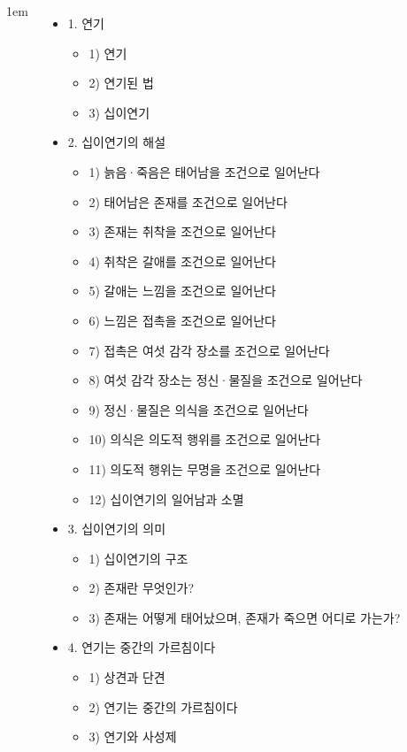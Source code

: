 \documentclass[	14pt, 
							a1paper, 
							portrait, %
							margin=0mm, %
							innermargin=10mm,  		%
							colspace=5mm, 
							subcolspace=0mm
							]{tikzposter}
\begin{document}
\begin{columns}
			{
					\setlength{\leftmargini}{2em}
					\setlength{\labelsep} {1em}
					\begin{itemize}
					\item 1. 연기
						\begin{itemize}
						\item 1) 연기
						\item 2) 연기된 법
						\item 3) 십이연기
						\end{itemize}

					\item 2. 십이연기의 해설
						\begin{itemize}
						\item 1) 늙음·죽음은 태어남을 조건으로 일어난다
						\item 2) 태어남은 존재를 조건으로 일어난다
						\item 3) 존재는 취착을 조건으로 일어난다
						\item 4) 취착은 갈애를 조건으로 일어난다
						\item 5) 갈애는 느낌을 조건으로 일어난다
						\item 6) 느낌은 접촉을 조건으로 일어난다
						\item 7) 접촉은 여섯 감각 장소를 조건으로 일어난다
						\item 8) 여섯 감각 장소는 정신·물질을 조건으로 일어난다
						\item 9) 정신·물질은 의식을 조건으로 일어난다
						\item 10) 의식은 의도적 행위를 조건으로 일어난다
						\item 11) 의도적 행위는 무명을 조건으로 일어난다
						\item 12) 십이연기의 일어남과 소멸
						\end{itemize}

					\item 3. 십이연기의 의미
						\begin{itemize}
						\item 1) 십이연기의 구조
						\item 2) 존재란 무엇인가?
						\item 3) 존재는 어떻게 태어났으며, 존재가 죽으면 어디로 가는가?
						\end{itemize}

					\item 4. 연기는 중간의 가르침이다
						\begin{itemize}
						\item 1) 상견과 단견
						\item 2) 연기는 중간의 가르침이다
						\item 3) 연기와 사성제
						\end{itemize}


\end{itemize}}
\end{columns}
\end{document}
